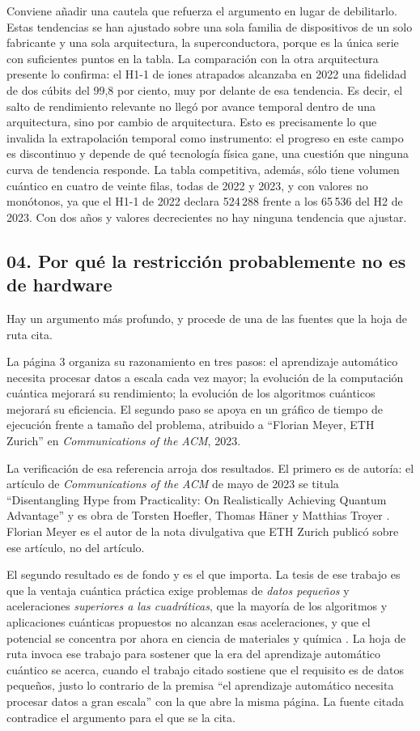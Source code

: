 \documentclass[11pt,letterpaper]{article}
\begin{document}
Conviene añadir una cautela que refuerza el argumento en lugar de debilitarlo.
Estas tendencias se han ajustado sobre una sola familia de dispositivos de un
solo fabricante y una sola arquitectura, la superconductora, porque es la única
serie con suficientes puntos en la tabla. La comparación con la otra
arquitectura presente lo confirma: el H1-1 de iones atrapados alcanzaba en 2022
una fidelidad de dos cúbits del 99,8 por ciento, muy por delante de esa
tendencia. Es decir, el salto de rendimiento relevante no llegó por avance
temporal dentro de una arquitectura, sino por cambio de arquitectura. Esto es
precisamente lo que invalida la extrapolación temporal como instrumento: el
progreso en este campo es discontinuo y depende de qué tecnología física gane,
una cuestión que ninguna curva de tendencia responde. La tabla competitiva,
además, sólo tiene volumen cuántico en cuatro de veinte filas, todas de 2022 y
2023, y con valores no monótonos, ya que el H1-1 de 2022 declara 524\,288
frente a los 65\,536 del H2 de 2023. Con dos años y valores decrecientes no hay
ninguna tendencia que ajustar.

\subsection*{04. Por qué la restricción probablemente no es de hardware}

Hay un argumento más profundo, y procede de una de las fuentes que la hoja de
ruta cita.

La página 3 organiza su razonamiento en tres pasos: el aprendizaje automático
necesita procesar datos a escala cada vez mayor; la evolución de la computación
cuántica mejorará su rendimiento; la evolución de los algoritmos cuánticos
mejorará su eficiencia. El segundo paso se apoya en un gráfico de tiempo de
ejecución frente a tamaño del problema, atribuido a \enquote{Florian Meyer, ETH
Zurich} en \emph{Communications of the ACM}, 2023.

La verificación de esa referencia arroja dos resultados. El primero es de
autoría: el artículo de \emph{Communications of the ACM} de mayo de 2023 se
titula \enquote{Disentangling Hype from Practicality: On Realistically
Achieving Quantum Advantage} y es obra de Torsten Hoefler, Thomas Häner y
Matthias Troyer \parencite{hoefler2023}. Florian Meyer es el autor de la nota
divulgativa que ETH Zurich publicó sobre ese artículo, no del artículo.

El segundo resultado es de fondo y es el que importa. La tesis de ese trabajo
es que la ventaja cuántica práctica exige problemas de \emph{datos pequeños} y
aceleraciones \emph{superiores a las cuadráticas}, que la mayoría de los
algoritmos y aplicaciones cuánticas propuestos no alcanzan esas aceleraciones,
y que el potencial se concentra por ahora en ciencia de materiales y química
\parencite{hoefler2023}. La hoja de ruta invoca ese trabajo para sostener que
la era del aprendizaje automático cuántico se acerca, cuando el trabajo citado
sostiene que el requisito es de datos pequeños, justo lo contrario de la
premisa \enquote{el aprendizaje automático necesita procesar datos a gran
escala} con la que abre la misma página. La fuente citada contradice el
argumento para el que se la cita.
\end{document}

